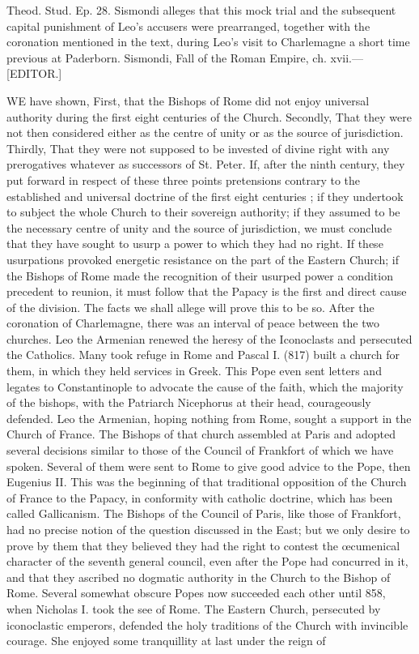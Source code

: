 Theod. Stud. Ep. 28. Sismondi alleges that this mock trial and the subsequent capital punishment of Leo’s accusers were prearranged, together with the coronation mentioned in the text, during Leo’s visit to Charlemagne a short time previous at Paderborn. Sismondi, Fall of the Roman Empire, ch. xvii.—[EDITOR.]


WE have shown, First, that the Bishops of Rome did not enjoy universal authority during the first eight centuries of the Church. Secondly, That they were not then considered either as the centre of unity or as the source of jurisdiction. Thirdly, That they were not supposed to be invested of divine right with any prerogatives whatever as successors of St. Peter. If, after the ninth century, they put forward in respect of these three points pretensions contrary to the established and universal doctrine of the first eight centuries ; if they undertook to subject the whole Church to their sovereign authority; if they assumed to be the necessary centre of unity and the source of jurisdiction, we must conclude that they have sought to usurp a power to which they had no right. If these usurpations provoked energetic resistance on the part of the Eastern Church; if the Bishops of Rome made the recognition of their usurped power a condition precedent to reunion, it must follow that the Papacy is the first and direct cause of the division. The facts we shall allege will prove this to be so. After the coronation of Charlemagne, there was an interval of peace between the two churches. Leo the Armenian renewed the heresy of the Iconoclasts and persecuted the Catholics. Many took refuge in Rome and Pascal I. (817) built a church for them, in which they held services in Greek. This Pope even sent letters and legates to Constantinople to advocate the cause of the faith, which the majority of the bishops, with the Patriarch Nicephorus at their head, courageously defended. Leo the Armenian, hoping nothing from Rome, sought a support in the Church of France. The Bishops of that church assembled at Paris and adopted several decisions similar to those of the Council of Frankfort of which we have spoken. Several of them were sent to Rome to give good advice to the Pope, then Eugenius II. This was the beginning of that traditional opposition of the Church of France to the Papacy, in conformity with catholic doctrine, which has been called Gallicanism. The Bishops of the Council of Paris, like those of Frankfort, had no precise notion of the question discussed in the East; but we only desire to prove by them that they believed they had the right to contest the œcumenical character of the seventh general council, even after the Pope had concurred in it, and that they ascribed no dogmatic authority in the Church to the Bishop of Rome. Several somewhat obscure Popes now succeeded each other until 858, when Nicholas I. took the see of Rome. The Eastern Church, persecuted by iconoclastic emperors, defended the holy traditions of the Church with invincible courage. She enjoyed some tranquillity at last under the reign of 